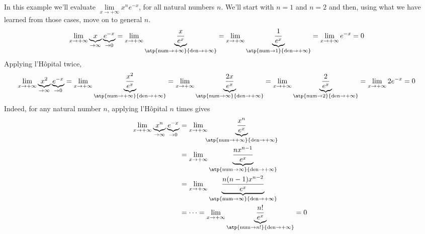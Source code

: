 \begin{enumerate}[(a)]
\begin{eg}\label{eg:hopitalJJ}
In this example we'll evaluate $\lim\limits_{x\rightarrow +\infty}
x^n e^{-x}$, for all natural numbers $n$. We'll start with $n=1$ and $n=2$
and then, using what we have learned from those cases, move on to
general $n$.
\begin{align*}
\lim_{x\rightarrow +\infty}\underbrace{x}_{\rightarrow \infty}
                      \underbrace{e^{-x}}_{\rightarrow 0}
& =\lim_{x\rightarrow +\infty}\underbrace{\frac{x}
     {e^x}}_{\atp
        {\mathrm{num}\rightarrow+\infty}
        {\mathrm{den}\rightarrow+\infty}}
 =\lim_{x\rightarrow +\infty}\underbrace{\frac{1}
     {e^x}}_{\atp
        {\mathrm{num}\rightarrow 1}
        {\mathrm{den}\rightarrow+\infty}}
=\lim_{x\rightarrow +\infty}e^{-x}
=0
\end{align*}
Applying l'H\^opital twice,
\begin{align*}
\lim_{x\rightarrow +\infty}\underbrace{x^2}_{\rightarrow \infty}
                      \underbrace{e^{-x}}_{\rightarrow 0}
& =\lim_{x\rightarrow +\infty}\underbrace{\frac{x^2}
     {e^x}}_{\atp
        {\mathrm{num}\rightarrow+\infty}
        {\mathrm{den}\rightarrow+\infty}}
 =\lim_{x\rightarrow +\infty}\underbrace{\frac{2x}
     {e^x}}_{\atp
        {\mathrm{num}\rightarrow \infty}
        {\mathrm{den}\rightarrow+\infty}}
 =\lim_{x\rightarrow +\infty}\underbrace{\frac{2}
     {e^x}}_{\atp
        {\mathrm{num}\rightarrow 2}
        {\mathrm{den}\rightarrow+\infty}}
=\lim_{x\rightarrow +\infty}2e^{-x}
=0
\end{align*}
Indeed, for any natural number $n$, applying l'H\^opital $n$ times gives
\begin{align*}
\lim_{x\rightarrow +\infty}\underbrace{x^n}_{\rightarrow \infty}
                      \underbrace{e^{-x}}_{\rightarrow 0}
& =\lim_{x\rightarrow +\infty}\hskip-5pt\underbrace{\frac{x^n}
     {e^x}}_{\atp
        {\mathrm{num}\rightarrow+\infty}
        {\mathrm{den}\rightarrow+\infty}} \\
& =\lim_{x\rightarrow +\infty}\underbrace{\frac{nx^{n-1}}
     {e^x}}_{\atp
        {\mathrm{num}\rightarrow \infty}
        {\mathrm{den}\rightarrow+\infty}}\\
& =\lim_{x\rightarrow +\infty}\underbrace{\frac{n(n-1)x^{n-2}}
     {e^x}}_{\atp
        {\mathrm{num}\rightarrow \infty}
        {\mathrm{den}\rightarrow+\infty}}\\
&=\cdots
 =\lim_{x\rightarrow +\infty}\underbrace{\frac{n!}
     {e^x}}_{\atp
        {\mathrm{num}\rightarrow n!}
        {\mathrm{den}\rightarrow+\infty}}
=0
\end{align*}



\end{eg}
\end{enumerate}
